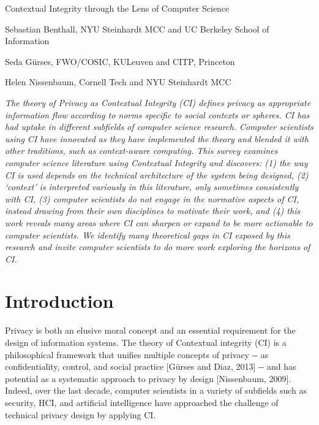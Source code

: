 \documentclass[../thesis.tex]{subfiles}
\begin{document}
{\centering
Contextual Integrity through the Lens of Computer Science
\par}


\bigskip

Sebastian Benthall, NYU Steinhardt MCC and UC Berkeley School of
Information


\bigskip

Seda G\"urses, FWO/COSIC, KULeuven and CITP, Princeton


\bigskip

Helen Nissenbaum, Cornell Tech and NYU Steinhardt MCC


\bigskip


\bigskip

\textit{The theory of Privacy as Contextual Integrity (CI) defines
privacy as appropriate information flow according to norms specific to
social contexts or spheres. CI has had uptake in different subfields of
computer science research. Computer scientists using CI have innovated
as they have implemented the theory and blended it with other
traditions, such as context-aware computing. This survey examines
computer science literature using Contextual Integrity and discovers:
(1) the way CI is used depends on the technical architecture of the
system being designed, (2) `context' is
interpreted variously in this literature, only sometimes consistently
with CI, (3) computer scientists do not engage in the normative aspects
of CI, instead drawing from their own disciplines to motivate their
work, and (4) this work reveals many areas where CI can sharpen or
expand to be more actionable to computer scientists. We identify many
theoretical gaps in CI exposed by this research and invite computer
scientists to do more work exploring the horizons of CI.}

\section{Introduction}
\label{CI1}

Privacy is both an elusive moral concept and an essential requirement
for the design of information systems. The theory of Contextual
integrity (CI) is a philosophical framework that unifies multiple
concepts of privacy -{}- as confidentiality, control, and social
practice [G\"urses and Diaz, 2013] -{}- and has potential as a
systematic approach to privacy by design [Nissenbaum, 2009]. Indeed,
over the last decade, computer scientists in a variety of subfields
such as security, HCI, and artificial intelligence have approached the
challenge of technical privacy design by applying CI.
\end{document}
